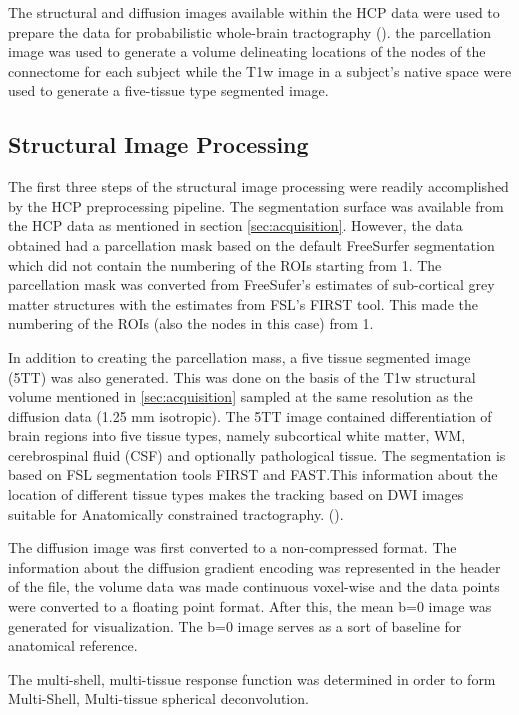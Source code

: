 \documentclass[msthesis.tex]{subfiles}
\begin{document}
The structural and diffusion images available within the HCP data were used to prepare the data for probabilistic whole-brain tractography (\cite{parker2003framework}). the parcellation image was used to generate a volume delineating locations of the nodes of the connectome for each subject while the T1w image in a subject's native space were used to generate a five-tissue type segmented image.

\subsection{Structural Image Processing}
\label{subsec:struct_diff}

The first three steps of the structural image processing were readily accomplished by the HCP preprocessing pipeline. The segmentation surface was available from the HCP data as mentioned in section \ref{sec:acquisition}. However, the data obtained had a parcellation mask based on the default FreeSurfer segmentation which did not contain the numbering of the ROIs starting from 1. The parcellation mask was converted from FreeSufer's estimates of sub-cortical grey matter structures with the estimates from FSL's FIRST tool. This made the numbering of the ROIs (also the nodes in this case) from 1. 

In addition to creating the parcellation mass, a five tissue segmented image (5TT) was also generated. This was done on the basis of the T1w structural volume mentioned in \ref{sec:acquisition} sampled at the same resolution as the diffusion data (1.25 mm isotropic). The 5TT image contained differentiation of brain regions into five tissue types, namely subcortical white matter, WM, cerebrospinal fluid (CSF) and optionally pathological tissue. The segmentation is based on FSL segmentation tools FIRST and FAST.This information about the location of different tissue types makes the tracking based on DWI images suitable for Anatomically constrained tractography.  (\cite{anattractsmith}). 


\iffalse
The diffusion image was first converted to a non-compressed format. The information about the diffusion gradient encoding was represented in the header of the file, the volume data was made continuous voxel-wise and the data points were converted to a floating point format. 
After this, the mean b=0 image was generated for visualization. The b=0 image serves as a sort of baseline for anatomical reference.

The multi-shell, multi-tissue response function was determined  in order to form Multi-Shell, Multi-tissue spherical deconvolution. 
\end{document}
